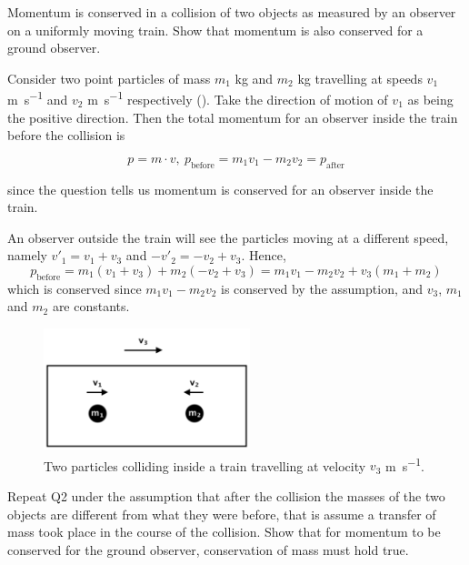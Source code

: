 \begin{question}
  Momentum is conserved in a collision of two objects as measured by an observer on a uniformly moving train. Show that momentum is also conserved for a ground observer.
\end{question}
\begin{solution}
  Consider two point particles of mass $m_1$ \si{kg} and $m_2$ \si{kg} travelling at speeds $v_1$ \si{m.s^{-1}} and $v_2$ \si{m.s^{-1}} respectively (). Take the direction of motion of $v_1$ as being the positive direction. Then the total momentum for an observer inside the train before the collision is

  \begin{equation}
    p = m \cdot v, ~ p_{\text{before}} = m_1 v_1 - m_2 v_2 = p_{\text{after}}
  \end{equation}

  since the question tells us momentum is conserved for an observer inside the train.

  An observer outside the train will see the particles moving at a different speed, namely $v'_1 = v_1 + v_3$ and $- v'_2 = - v_2 + v_3$. Hence,
  \begin{equation} \label{eq:q2eq2}
    p_{\text{before}} = m_1 (v_1 + v_3) + m_2 (- v_2 + v_3) = m_1 v_1 - m_2 v_2 + v_3 (m_1 + m_2)
  \end{equation}
  which is conserved since $m_1 v_1 - m_2 v_2$ is conserved by the assumption, and $v_3$, $m_1$ and $m_2$ are constants.
\end{solution}

\begin{figure}[h] \centering
  \includegraphics[width=6cm]{fig/1q2.png}
  \caption{Two particles colliding inside a train travelling at velocity $v_3$ \si{m.s^{-1}}.} \label{fig:1q2}
\end{figure}


\begin{question}
  Repeat Q2 under the assumption that after the collision the masses of the two objects are different from what they were before, that is assume a transfer of mass took place in the course of the collision. Show that for momentum to be conserved for the ground observer, conservation of mass must hold true.
\end{question}

